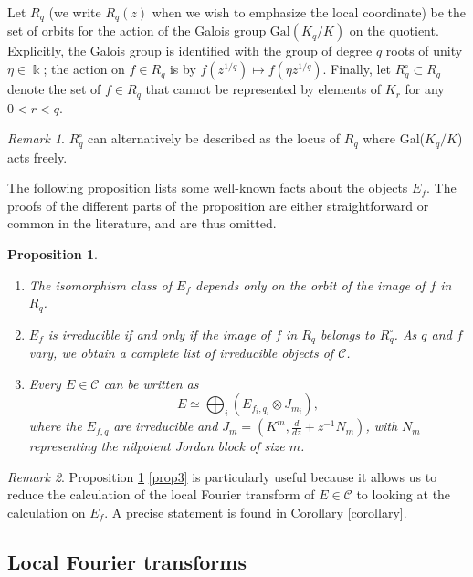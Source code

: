\documentclass[11pt]{amsart}
\theoremstyle{plain}
\newtheorem{proposition}[theorem]{Proposition}
\theoremstyle{definition}
\theoremstyle{remark}
\newtheorem*{remark}{Remark}
\def\comp{\circ}
\begin{document}
Let $R_q$ (we write $R_q(z)$ when we wish to emphasize the local coordinate) be the set of orbits for the action of the Galois group $\mathrm{Gal}(K_q/K)$ on the quotient\label{conn quotient}. Explicitly, the
Galois group is identified with the group of degree $q$ roots of unity $\eta\in \Bbbk$; the action on $f\in R_q$ is by 
$f(z^{1/q})\mapsto f(\eta z^{1/q})$. Finally, let $R^\comp_q\subset R_q$ denote the set of $f\in R_q$ that cannot be represented 
by elements of $K_r$ for any $0<r<q$.

\begin{remark}
  $R^\comp_q$ can alternatively be described as the locus of $R_q$ where Gal($K_q/K$) acts freely.
\end{remark}

The following proposition lists some well-known facts about the objects $E_f$.  The proofs of the different parts of the proposition are either straightforward or common in the literature, and are thus omitted.

\begin{proposition}\label{prop} \mbox{}
\begin{enumerate}
\item \label{prop1} The isomorphism class of $E_f$ depends only on the orbit of the image of $f$ in $R_q$.
\item \label{prop2} $E_f$ is irreducible if and only if the image of $f$ in $R_q$ belongs to $R^\comp_q$. As $q$ and $f$ vary,
we obtain a complete list of irreducible objects of $\mathcal{C}$.
\item \label{prop3}Every $E\in\mathcal{C}$ can be written as
\[E\simeq\bigoplus_i(E_{f_i,q_i}\otimes J_{m_i}),\]
where the $E_{f,q}$ are irreducible and $J_m=(K^m,\frac{d}{dz}+z^{-1}N_m)$, with $N_m$ representing the nilpotent Jordan block of size $m$.
\end{enumerate}
\end{proposition}

\begin{remark}
Proposition \ref{prop} \eqref{prop3} is particularly useful because it allows us to reduce the calculation of the local Fourier transform of $E\in\mathcal{C}$ to looking at the calculation on $E_f$.  A precise statement is found in Corollary \ref{corollary}.
\end{remark}


\subsection{Local Fourier transforms}\label{subsec LFT}
\end{document}
